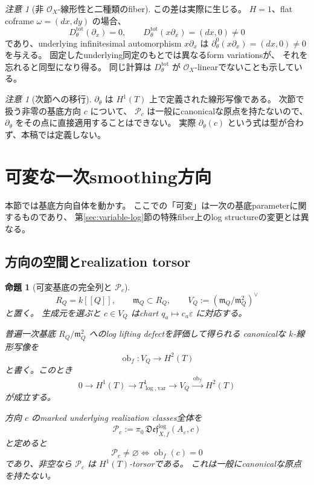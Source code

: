 \documentclass[uplatex,dvipdfmx,11pt]{jsarticle}
\numberwithin{equation}{section}
\theoremstyle{plain}
\newtheorem{proposition}[theorem]{命題}
\theoremstyle{definition}
\theoremstyle{remark}
\newtheorem{remark}[theorem]{注意}
\DeclareMathOperator{\obf}{ob}
\newcommand{\OO}{\mathcal O}
\newcommand{\Dtot}{D_\theta^{\mathrm{tot}}}
\newcommand{\Aeps}{A_\varepsilon}
\begin{document}
\begin{remark}[非 \(\OO_X\)-線形性と二種類のfiber]
\label{rem:two-fibers}
この差は実際に生じる。
\(H=1\)、flat coframe \(\omega=(dx,dy)\) の場合、
\[
\Dtot(\partial_x)=0,\qquad
\Dtot(x\partial_x)=(dx,0)\ne0
\]
であり、underlying infinitesimal automorphism \(x\partial_x\) は
\(\partial_\theta^0(x\partial_x)=(dx,0)\ne0\) を与える。
固定したunderlying同定のもとでは異なるform variationsが、
それを忘れると同型になり得る。
同じ計算は \(\Dtot\) が \(\OO_X\)-linearでないことも示している。
\end{remark}

\begin{remark}[次節への移行]
\label{rem:to-variable}
\(\partial_\theta\) は \(H^1(T)\) 上で定義された線形写像である。
次節で扱う非零の基底方向 \(c\) について、
\(\mathcal P_c\) は一般にcanonicalな原点を持たないので、
\(\partial_\theta\) をその点に直接適用することはできない。
実際 \(\partial_\theta(c)\) という式は型が合わず、本稿では定義しない。
\end{remark}

\section{可変な一次smoothing方向}
\label{sec:variable-direction}

本節では基底方向自体を動かす。
ここでの「可変」は一次の基底parameterに関するものであり、
第\ref{sec:variable-log}節の特殊fiber上のlog structureの変更とは異なる。

\subsection{方向の空間とrealization torsor}

\begin{proposition}[可変基底の完全列と \(\mathcal P_c\)]
\label{prop:variable-base}
\[
R_Q=k[[Q]],\qquad \mathfrak m_Q\subset R_Q,\qquad
V_Q:=(\mathfrak m_Q/\mathfrak m_Q^2)^\vee
\]
と置く。
生成元を選ぶと \(c\in V_Q\) はchart \(q_a\mapsto c_a\varepsilon\) に対応する。

普遍一次基底 \(R_Q/\mathfrak m_Q^2\) へのlog lifting defectを評価して得られる
canonicalな \(k\)-線形写像を
\[
\obf_f:V_Q\longrightarrow H^2(T)
\]
と書く。このとき
\begin{equation}
\label{eq:variable-base-sequence}
0\longrightarrow H^1(T)\longrightarrow T^1_{\log,\mathrm{var}}
\longrightarrow V_Q\xrightarrow{\ \obf_f\ }H^2(T)
\end{equation}
が成立する。

方向 \(c\) のmarked underlying realization classes全体を
\begin{equation}
\label{eq:Pc}
\mathcal P_c:=\pi_0\,\mathfrak{Def}^{\log}_{X,f}(\Aeps,c)
\end{equation}
と定めると
\[
\mathcal P_c\ne\varnothing\iff\obf_f(c)=0
\]
であり、非空なら \(\mathcal P_c\) は \(H^1(T)\)-torsorである。
これは一般にcanonicalな原点を持たない。
\end{proposition}
\end{document}
